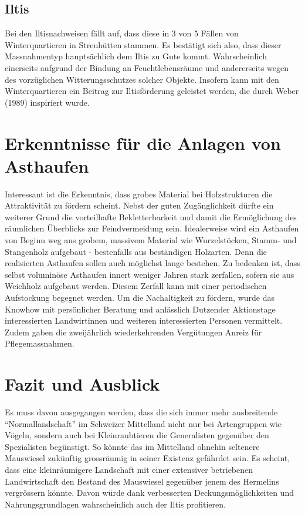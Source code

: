 \documentclass[
  oneside]{scrbook}
\begin{document}
\hypertarget{iltis}{%
\subsection{Iltis}\label{iltis}}

Bei den Iltisnachweisen fällt auf, dass diese in 3 von 5 Fällen von Winterquartieren in Streuhütten stammen. Es bestätigt sich also, dass dieser Massnahmentyp hauptsächlich dem Iltis zu Gute kommt. Wahrscheinlich einerseits aufgrund der Bindung an Feuchtlebensräume und andererseits wegen des vorzüglichen Witterungsschutzes solcher Objekte. Insofern kann mit den Winterquartieren ein Beitrag zur Iltisförderung geleistet werden, die durch Weber (1989) inspiriert wurde.

\hypertarget{erkenntnisse-fuxfcr-die-anlagen-von-asthaufen}{%
\section{Erkenntnisse für die Anlagen von Asthaufen}\label{erkenntnisse-fuxfcr-die-anlagen-von-asthaufen}}

Interessant ist die Erkenntnis, dass grobes Material bei Holzstrukturen die Attraktivität zu fördern scheint. Nebst der guten Zugänglichkeit dürfte ein weiterer Grund die vorteilhafte Bekletterbarkeit und damit die Ermöglichung des räumlichen Überblicks zur Feindvermeidung sein.
Idealerweise wird ein Asthaufen von Beginn weg aus grobem, massivem Material wie Wurzelstöcken, Stamm- und Stangenholz aufgebaut - bestenfalls aus beständigen Holzarten. Denn die realisierten Asthaufen sollen auch möglichst lange bestehen. Zu bedenken ist, dass selbst voluminöse Asthaufen innert weniger Jahren stark zerfallen, sofern sie aus Weichholz aufgebaut werden. Diesem Zerfall kann mit einer periodischen Aufstockung begegnet werden.
Um die Nachaltigkeit zu fördern, wurde das Knowhow mit persönlicher Beratung und anlässlich Dutzender Aktionstage interessierten Landwirtinnen und weiteren interessierten Personen vermittelt. Zudem gaben die zweijährlich wiederkehrenden Vergütungen Anreiz für Pflegemassnahmen.

\hypertarget{fazit-und-ausblick}{%
\section{Fazit und Ausblick}\label{fazit-und-ausblick}}

Es muss davon ausgegangen werden, dass die sich immer mehr ausbreitende ``Normallandschaft'' im Schweizer Mittelland nicht nur bei Artengruppen wie Vögeln, sondern auch bei Kleinraubtieren die Generalisten gegenüber den Spezialisten begünstigt. So könnte das im Mittelland ohnehin seltenere Mauswiesel zukünftig grossräumig in seiner Existenz gefährdet sein. Es scheint, dass eine kleinräumigere Landschaft mit einer extensiver betriebenen Landwirtschaft den Bestand des Mauswiesel gegenüber jenem des Hermelins vergrössern könnte. Davon würde dank verbesserten Deckungsmöglichkeiten und Nahrungsgrundlagen wahrscheinlich auch der Iltis profitieren.
\end{document}
